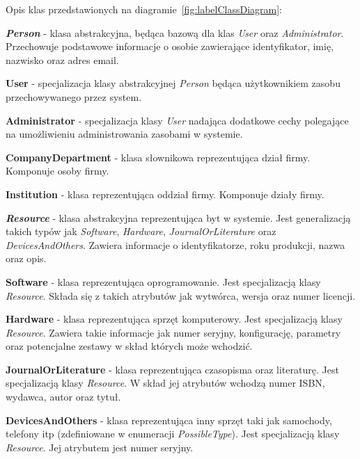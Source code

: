 Opis klas przedstawionych na diagramie~\ref{fig:labelClassDiagram}:
\begin{description}
	\item \textbf{\textit{Person}} - klasa abstrakcyjna, będąca bazową dla klas \textit{User} oraz \textit{Administrator}. Przechowuje podstawowe informacje o osobie zawierające identyfikator, imię, nazwisko oraz adres email.
	
	\item \textbf{User} - specjalizacja klasy abstrakcyjnej \textit{Person} będąca użytkownikiem zasobu przechowywanego przez system.
	
	\item \textbf{Administrator} - specjalizacja klasy \textit{User} nadająca dodatkowe cechy polegające na umożliwieniu administrowania zasobami w systemie.
	
	\item \textbf{CompanyDepartment} - klasa słownikowa reprezentująca dział firmy. Komponuje osoby firmy.
	
	\item \textbf{Institution} - klasa reprezentująca oddział firmy. Komponuje działy firmy.
	
	\item \textbf{\textit{Resource}} - klasa abstrakcyjna reprezentująca byt w systemie. Jest generalizacją takich typów jak \textit{Software}, \textit{Hardware}, \textit{JournalOrLiterature} oraz \textit{DevicesAndOthers}. Zawiera informacje o identyfikatorze, roku produkcji, nazwa oraz opis.
	
	\item \textbf{Software} - klasa reprezentująca oprogramowanie. Jest specjalizacją klasy \textit{Resource}. Składa się z takich atrybutów jak wytwórca, wersja oraz numer licencji.
	
	\item \textbf{Hardware} - klasa reprezentująca sprzęt komputerowy. Jest specjalizacją klasy \textit{Resource}. Zawiera takie informacje jak numer seryjny, konfigurację, parametry oraz potencjalne zestawy w skład których może wchodzić.
		
	\item \textbf{JournalOrLiterature} - klasa reprezentująca czasopisma oraz literaturę. Jest specjalizacją klasy \textit{Resource}. W skład jej atrybutów wchodzą numer ISBN, wydawca, autor oraz tytuł.
		
	\item \textbf{DevicesAndOthers} - klasa reprezentująca inny sprzęt taki jak samochody, telefony itp (zdefiniowane w enumeracji \textit{PossibleType}). Jest specjalizacją klasy \textit{Resource}. Jej atrybutem jest numer seryjny.
	

\end{description}
